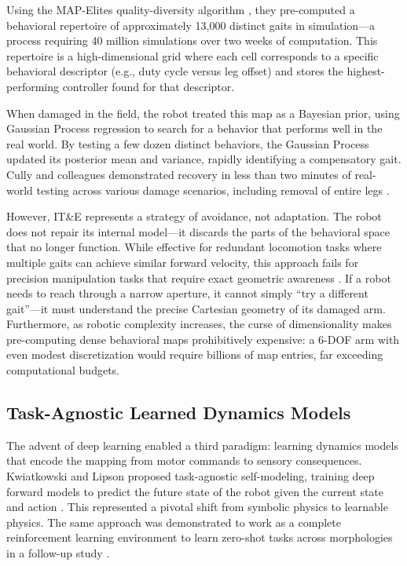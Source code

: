 \documentclass[12pt,a4paper,oneside]{report}
\begin{document}
Using the MAP-Elites quality-diversity algorithm \cite{mouret2015illuminating}, they pre-computed a behavioral repertoire of approximately 13,000 distinct gaits in simulation—a process requiring 40 million simulations over two weeks of computation. This repertoire is a high-dimensional grid where each cell corresponds to a specific behavioral descriptor (e.g., duty cycle versus leg offset) and stores the highest-performing controller found for that descriptor.

When damaged in the field, the robot treated this map as a Bayesian prior, using Gaussian Process regression to search for a behavior that performs well in the real world. By testing a few dozen distinct behaviors, the Gaussian Process updated its posterior mean and variance, rapidly identifying a compensatory gait. Cully and colleagues demonstrated recovery in less than two minutes of real-world testing across various damage scenarios, including removal of entire legs \cite{cully2015robots}.

However, IT\&E represents a strategy of avoidance, not adaptation. The robot does not repair its internal model—it discards the parts of the behavioral space that no longer function. While effective for redundant locomotion tasks where multiple gaits can achieve similar forward velocity, this approach fails for precision manipulation tasks that require exact geometric awareness \cite{kwiatkowski2019task}. If a robot needs to reach through a narrow aperture, it cannot simply ``try a different gait''—it must understand the precise Cartesian geometry of its damaged arm. Furthermore, as robotic complexity increases, the curse of dimensionality makes pre-computing dense behavioral maps prohibitively expensive: a 6-DOF arm with even modest discretization would require billions of map entries, far exceeding computational budgets.

\subsection{Task-Agnostic Learned Dynamics Models}
\label{subsec:task_agnostic_models}

The advent of deep learning enabled a third paradigm: learning dynamics models that encode the mapping from motor commands to sensory consequences. Kwiatkowski and Lipson proposed task-agnostic self-modeling, training deep forward models to predict the future state of the robot given the current state and action \cite{kwiatkowski2019task}. This represented a pivotal shift from symbolic physics to learnable physics. The same approach was demonstrated to work as a complete reinforcement learning environment to learn zero-shot tasks across morphologies in a follow-up study \cite{kwiatkowski2019zeroshot}.
\end{document}
